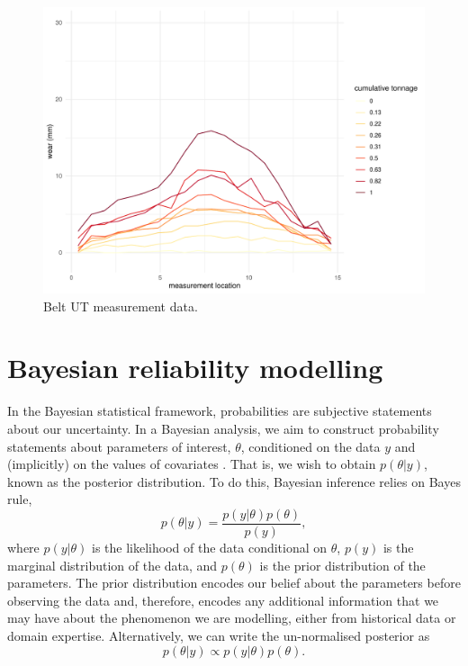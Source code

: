 \begin{figure}[h]
  \centering
  \includegraphics[width=1\textwidth]{./figures/belt_wear_ut.pdf}
  \caption{Belt UT measurement data.}
  \label{fig:belt_wear_ut}
\end{figure}

\section{Bayesian reliability modelling}
\label{sec:Bayesian-methods}

In the Bayesian statistical framework, probabilities are subjective statements about our uncertainty. In a Bayesian analysis, we aim to construct probability statements about parameters of interest, $\theta$, conditioned on the data $y$ and (implicitly) on the values of covariates \citep{BDA2020}. That is, we wish to obtain $p(\theta|y)$, known as the posterior distribution. To do this, Bayesian inference relies on Bayes rule,
\begin{equation}
  p(\theta|y) = \frac{p(y|\theta)p(\theta)}{p(y)},
\end{equation}
where $p(y|\theta)$ is the likelihood of the data conditional on $\theta$, $p(y)$ is the marginal distribution of the data, and $p(\theta)$ is the prior distribution of the parameters. The prior distribution encodes our belief about the parameters before observing the data and, therefore, encodes any additional information that we may have about the phenomenon we are modelling, either from historical data or domain expertise. Alternatively, we can write the un-normalised posterior as
\begin{equation}
  p(\theta|y) \propto p(y|\theta)p(\theta).
\end{equation}

